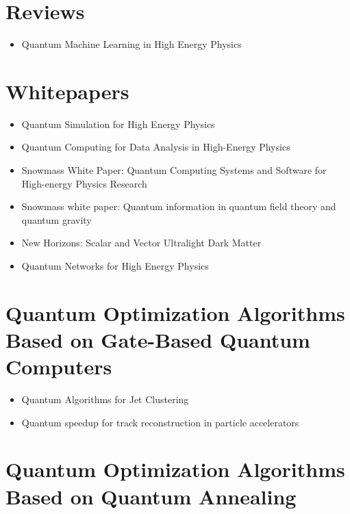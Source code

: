 \section{Reviews}

\begin{itemize}
   \item Quantum Machine Learning in High Energy Physics~\cite{Guan:2020bdl}
\end{itemize}


\section{Whitepapers}

\begin{itemize}
   \item Quantum Simulation for High Energy Physics~\cite{Bauer:2022hpo}
   \item Quantum Computing for Data Analysis in High-Energy Physics~\cite{Delgado:2022tpc}
   \item Snowmass White Paper: Quantum Computing Systems and Software for High-energy Physics Research~\cite{Humble:2022vtm}
   \item Snowmass white paper: Quantum information in quantum field theory and quantum gravity~\cite{Faulkner:2022mlp}
   \item New Horizons: Scalar and Vector Ultralight Dark Matter~\cite{Antypas:2022asj}
   \item Quantum Networks for High Energy Physics~\cite{Derevianko:2022lmn}
\end{itemize}


\section{Quantum Optimization Algorithms Based on Gate-Based Quantum Computers}

\begin{itemize}
   \item Quantum Algorithms for Jet Clustering~\cite{Wei:2019rqy}
   \item Quantum speedup for track reconstruction in particle accelerators~\cite{Magano:2021jzd}
\end{itemize}


\section{Quantum Optimization Algorithms Based on Quantum Annealing}

